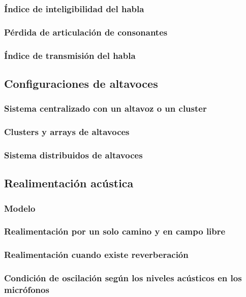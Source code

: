 \documentclass[a4paper, 8pt]{extarticle}
\begin{document}
\begin{multicols}{3}
  \subsubsection{Índice de inteligibilidad del habla}
  \subsubsection{Pérdida de articulación de consonantes}
  \subsubsection{Índice de transmisión del habla}

  \subsection{Configuraciones de altavoces}
  \subsubsection{Sistema centralizado con un altavoz o un cluster}
  \subsubsection{Clusters y arrays de altavoces}
  \subsubsection{Sistema distribuidos de altavoces}

  \subsection{Realimentación acústica}
  \subsubsection{Modelo}
  \subsubsection{Realimentación por un solo camino y en campo libre}
  \subsubsection{Realimentación cuando existe reverberación}
  \subsubsection{Condición de oscilación según los niveles acústicos en los micrófonos}

\end{multicols}
\end{document}
